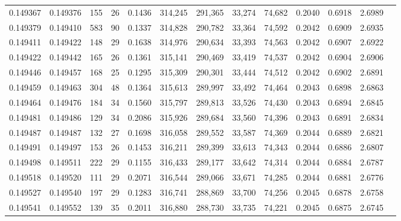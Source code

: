 \begin{tabular}{rrrrrrrrrrrrr}
0.149367 & 0.149376 &   155 &  26 &                                     0.1436 & 314,245 & 291,365 &  33,274 &  74,682 & 0.2040 & 0.6918 & 2.6989 \\
0.149379 & 0.149410 &   583 &  90 &                                     0.1337 & 314,828 & 290,782 &  33,364 &  74,592 & 0.2042 & 0.6909 & 2.6935 \\
0.149411 & 0.149422 &   148 &  29 &                                     0.1638 & 314,976 & 290,634 &  33,393 &  74,563 & 0.2042 & 0.6907 & 2.6922 \\
0.149422 & 0.149442 &   165 &  26 &                                     0.1361 & 315,141 & 290,469 &  33,419 &  74,537 & 0.2042 & 0.6904 & 2.6906 \\
0.149446 & 0.149457 &   168 &  25 &                                     0.1295 & 315,309 & 290,301 &  33,444 &  74,512 & 0.2042 & 0.6902 & 2.6891 \\
0.149459 & 0.149463 &   304 &  48 &                                     0.1364 & 315,613 & 289,997 &  33,492 &  74,464 & 0.2043 & 0.6898 & 2.6863 \\
0.149464 & 0.149476 &   184 &  34 &                                     0.1560 & 315,797 & 289,813 &  33,526 &  74,430 & 0.2043 & 0.6894 & 2.6845 \\
0.149481 & 0.149486 &   129 &  34 &                                     0.2086 & 315,926 & 289,684 &  33,560 &  74,396 & 0.2043 & 0.6891 & 2.6834 \\
0.149487 & 0.149487 &   132 &  27 &                                     0.1698 & 316,058 & 289,552 &  33,587 &  74,369 & 0.2044 & 0.6889 & 2.6821 \\
0.149491 & 0.149497 &   153 &  26 &                                     0.1453 & 316,211 & 289,399 &  33,613 &  74,343 & 0.2044 & 0.6886 & 2.6807 \\
0.149498 & 0.149511 &   222 &  29 &                                     0.1155 & 316,433 & 289,177 &  33,642 &  74,314 & 0.2044 & 0.6884 & 2.6787 \\
0.149518 & 0.149520 &   111 &  29 &                                     0.2071 & 316,544 & 289,066 &  33,671 &  74,285 & 0.2044 & 0.6881 & 2.6776 \\
0.149527 & 0.149540 &   197 &  29 &                                     0.1283 & 316,741 & 288,869 &  33,700 &  74,256 & 0.2045 & 0.6878 & 2.6758 \\
0.149541 & 0.149552 &   139 &  35 &                                     0.2011 & 316,880 & 288,730 &  33,735 &  74,221 & 0.2045 & 0.6875 & 2.6745 \\

\end{tabular}
